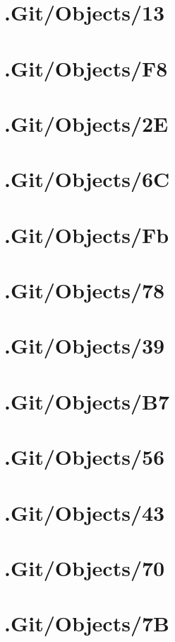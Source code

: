 \section*{.Git/Objects/13}

\section*{.Git/Objects/F8}

\section*{.Git/Objects/2E}

\section*{.Git/Objects/6C}

\section*{.Git/Objects/Fb}

\section*{.Git/Objects/78}

\section*{.Git/Objects/39}

\section*{.Git/Objects/B7}

\section*{.Git/Objects/56}

\section*{.Git/Objects/43}

\section*{.Git/Objects/70}

\section*{.Git/Objects/7B}

